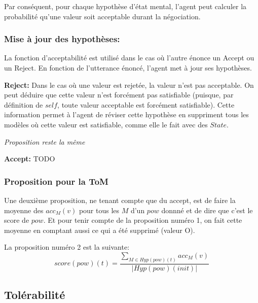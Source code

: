 \documentclass{llncs}
\begin{document}
	Par conséquent, pour chaque hypothèse d'état mental, l'agent peut calculer la probabilité qu'une valeur soit acceptable durant la négociation.
	
	\subsubsection{Mise à jour des hypothèses:}
		La fonction d'acceptabilité est utilisé dans le cas où l'autre énonce un Accept ou un Reject. En fonction de l'utterance énoncé, l'agent met à jour ses hypothèses. 
		
		\textbf{Reject:} Dans le cas où une valeur est rejetée, la valeur n'est pas acceptable. On peut déduire que cette valeur n'est forcément pas satisfiable (puisque, par définition de $self$, toute valeur acceptable est forcément satisfiable). Cette information permet à l'agent de réviser cette hypothèse en suppriment tous les modèles où cette valeur est satisfiable, comme elle le fait avec des $State$.
		
		\emph{Proposition reste la même}
		
		\textbf{Accept:} TODO
%	

	\subsubsection{Proposition pour la ToM}
	Une deuxième proposition, ne tenant compte que du accept, est de faire la moyenne des $acc_{M}(v)$ pour tous les $M$ d'un $pow$ donnné et de dire que c'est le score de $pow$. Et pour tenir compte de la proposition numéro 1, on fait cette moyenne en comptant aussi ce qui a été supprimé (valeur O).
	
	La proposition numéro 2 est la suivante:
	$$score(pow)(t) = \frac{\sum_{M\in Hyp(pow)(t)} acc_M(v)}{|Hyp(pow)(init)|}$$


	\subsection{Tolérabilité}
	
	
	
\end{document}
